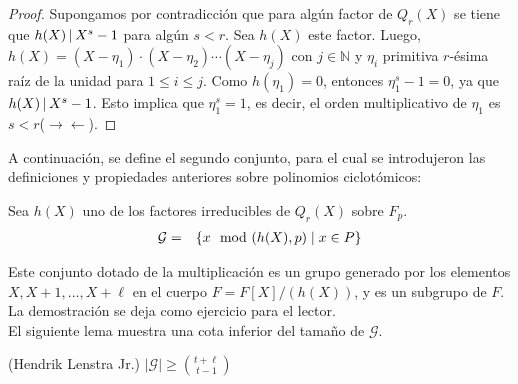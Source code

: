 	\begin{proof}
		Supongamos por contradicción que para algún factor de $Q_r(X)$ se tiene que $h(X)\hspace{1.8pt}|\hspace{1.8pt}  X^s-1$ para algún $s<r$. Sea $h(X)$ este factor. Luego, $h(X)= (X-\eta_1)\cdot(X-\eta_2)\cdots(X-\eta_j)$ con $j\in\mathbb{N}$ y $\eta_i$ primitiva $r$-ésima raí­z de la unidad para $1\leq i\leq j$. Como $h(\eta_1) = 0$, entonces  $\eta_1^s-1 = 0$, ya que $h(X)\hspace{1.8pt}|\hspace{1.8pt}  X^s-1$. Esto implica que $\eta_1^s=1$, es decir, el orden multiplicativo de $\eta_1$ es $s<r$($\rightarrow\leftarrow$).
	\end{proof}
	A continuación, se define el segundo conjunto, para el cual se introdujeron las definiciones y propiedades anteriores sobre polinomios ciclotómicos:
	\begin{definition}
		Sea $h(X)$ uno de los factores irreducibles de $Q_r(X)$ sobre $F_p$.
		\begin{eqnarray}
			\mathcal{G} &=& \{x\mod (h(X),p)\mid x\in P\}\nonumber 
		\end{eqnarray}
		
	\end{definition}
	Este conjunto dotado de la multiplicación es un grupo generado por los elementos $X,X+1,...,X+\ell $ en el cuerpo $F=F[X]/(h(X))$, y es un subgrupo de $F$. La demostración se deja como ejercicio para el lector.\\
	El siguiente lema muestra una cota inferior del tamaño de $\mathcal{G}$.
	\begin{lemma}
		(Hendrik Lenstra Jr.) $|\mathcal{G}|\geq {{t+\ell }\choose{t-1}}$
	\end{lemma}
	
